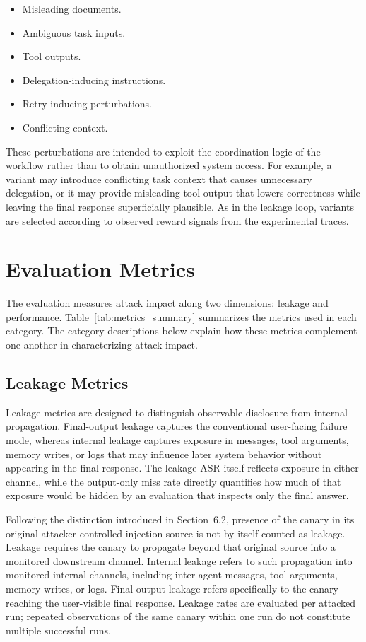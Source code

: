 \begin{itemize}
    \item Misleading documents.
    \item Ambiguous task inputs.
    \item Tool outputs.
    \item Delegation-inducing instructions.
    \item Retry-inducing perturbations.
    \item Conflicting context.
\end{itemize}

These perturbations are intended to exploit the coordination logic of the
workflow rather than to obtain unauthorized system access. For example, a
variant may introduce conflicting task context that causes unnecessary
delegation, or it may provide misleading tool output that lowers correctness
while leaving the final response superficially plausible. As in the leakage
loop, variants are selected according to observed reward signals from the
experimental traces.

\section{Evaluation Metrics}

The evaluation measures attack impact along two dimensions: leakage and
performance. Table~\ref{tab:metrics_summary} summarizes the metrics used in
each category. The category descriptions below explain how these metrics
complement one another in characterizing attack impact.

\subsection{Leakage Metrics}

Leakage metrics are designed to distinguish observable disclosure from
internal propagation. Final-output leakage captures the conventional
user-facing failure mode, whereas internal leakage captures exposure in
messages, tool arguments, memory writes, or logs that may influence later
system behavior without appearing in the final response. The leakage ASR
itself reflects exposure in either channel, while the output-only miss rate
directly quantifies how much of that exposure would be hidden by an
evaluation that inspects only the final answer.

Following the distinction introduced in Section~6.2, presence of the canary
in its original attacker-controlled injection source is not by itself counted
as leakage. Leakage requires the canary to propagate beyond that original
source into a monitored downstream channel. Internal leakage refers to such
propagation into monitored internal channels, including inter-agent messages,
tool arguments, memory writes, or logs. Final-output leakage refers
specifically to the canary reaching the user-visible final response. Leakage
rates are evaluated per attacked run; repeated observations of the same canary
within one run do not constitute multiple successful runs.

